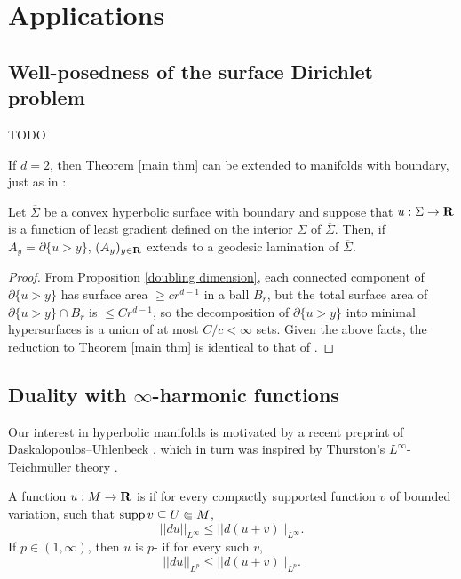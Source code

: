 \section{Applications}\label{proof of main thm}
\subsection{Well-posedness of the surface Dirichlet problem}
TODO 

If $d = 2$, then Theorem \ref{main thm} can be extended to manifolds with boundary, just as in \cite[Corollary 3.5]{górny2017planar}:

\begin{proposition}\label{main crly}
Let $\overline \Sigma$ be a convex hyperbolic surface with boundary and suppose that $u: \Sigma \to \mathbf{R}$ is a function of least gradient defined on the interior $\Sigma$ of $\overline \Sigma$.
Then, if $A_y = \partial \{u > y\}$, $(A_y)_{y \in \mathbf{R}}$ extends to a geodesic lamination of $\overline \Sigma$.
\end{proposition}
\begin{proof}
From Proposition \ref{doubling dimension}, each connected component of $\partial \{u > y\}$ has surface area $\geq cr^{d - 1}$ in a ball $B_r$, but the total surface area of $\partial \{u > y\} \cap B_r$ is $\leq Cr^{d - 1}$, so the decomposition of $\partial \{u > y\}$ into minimal hypersurfaces is a union of at most $C/c < \infty$ sets.
Given the above facts, the reduction to Theorem \ref{main thm} is identical to that of \cite[Corollary 3.5]{górny2017planar}.
\end{proof}


\subsection{Duality with \texorpdfstring{$\infty$}{infinity}-harmonic functions}
Our interest in hyperbolic manifolds is motivated by a recent preprint of Daskalopoulos--Uhlenbeck \cite{daskalopoulos2020transverse}, which in turn was inspired by Thurston's $L^\infty$-Teichm\"uller theory \cite{thurston1998minimal}.

\begin{definition}
A function $u: M \to \mathbf{R}$ is  if for every compactly supported function $v$ of bounded variation, such that $\operatorname{supp} v \subseteq U \Subset M$,
$$||du||_{L^\infty} \leq ||d(u + v)||_{L^\infty}.$$
If $p \in (1, \infty)$, then $u$ is $p$- if for every such $v$,
$$||du||_{L^p} \leq ||d(u + v)||_{L^p}.$$
\end{definition}

